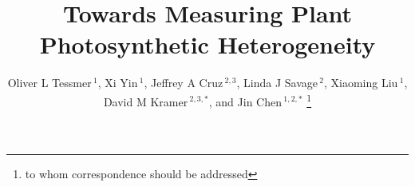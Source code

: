 \documentclass{bioinfo}
\begin{document}

\title{Towards Measuring Plant Photosynthetic Heterogeneity}
\author[Tessmer \textit{et~al}]{Oliver L Tessmer\,$^{1}$, Xi Yin\,$^{1}$, Jeffrey A Cruz\,$^{2,3}$, Linda J Savage\,$^{2}$, Xiaoming Liu\,$^{1}$, David M Kramer\,$^{2,3,\ast}$, and Jin Chen\,$^{1,2,\ast}$ \footnote{to whom correspondence should be addressed}}
\address{$^{1}$Department of Computer Science and Engineering, Michigan State University, East Lansing, MI 48824, USA\\
$^{2}$Department of Energy Plant Research Laboratory, Michigan State University, East Lansing, MI 48824, USA\\
$^{3}$Department of Biochemistry and Molecular Biology, Michigan State University, East Lansing, MI 48824, USA}



\maketitle
\end{document}
